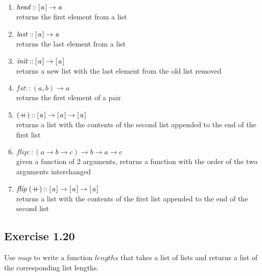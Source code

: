 \documentclass{article}
\newcommand{\Varid}[1]{\mathit{#1}}
\newcommand{\plus}{\mathbin{+\!\!\!+}}
\begin{document}
\begin{enumerate}
  \item \ensuremath{\Varid{head}\mathbin{::}[\mskip1.5mu \Varid{a}\mskip1.5mu]\to \Varid{a}}\\
     returns the first element from a list

  \item \ensuremath{\Varid{last}\mathbin{::}[\mskip1.5mu \Varid{a}\mskip1.5mu]\to \Varid{a}}\\
     returns the last element from a list

  \item \ensuremath{\Varid{init}\mathbin{::}[\mskip1.5mu \Varid{a}\mskip1.5mu]\to [\mskip1.5mu \Varid{a}\mskip1.5mu]}\\
     returns a new list with the last element from the old list removed

  \item \ensuremath{\Varid{fst}\mathbin{::}(\Varid{a},\Varid{b})\to \Varid{a}}\\
     returns the first element of a pair

  \item \ensuremath{(\plus )\mathbin{::}[\mskip1.5mu \Varid{a}\mskip1.5mu]\to [\mskip1.5mu \Varid{a}\mskip1.5mu]\to [\mskip1.5mu \Varid{a}\mskip1.5mu]}\\
     returns a list with the contents of the second list appended to the end of the first list

  \item \ensuremath{\Varid{flip}\mathbin{::}(\Varid{a}\to \Varid{b}\to \Varid{c})\to \Varid{b}\to \Varid{a}\to \Varid{c}}\\
     given a function of 2 arguments, returns a function with the order of the two arguments interchanged

  \item \ensuremath{\Varid{flip}\;(\plus )\mathbin{::}[\mskip1.5mu \Varid{a}\mskip1.5mu]\to [\mskip1.5mu \Varid{a}\mskip1.5mu]\to [\mskip1.5mu \Varid{a}\mskip1.5mu]}\\
     returns a list with the contents of the first list appended to the end of the second list
\end{enumerate}

\subsection*{Exercise 1.20}
Use \ensuremath{\Varid{map}} to write a function \ensuremath{\Varid{lengths}} that takes a list of lists and returns a list of the corresponding list lengths.
\end{document}
